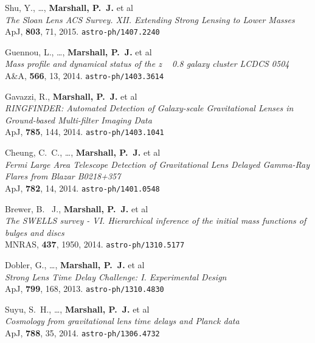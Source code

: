 \begin{revnumerate}
  \item{Shu, Y., \ldots, \textbf{Marshall, P.~J.} et al\\
  \textit{The Sloan Lens ACS Survey. XII. Extending Strong Lensing to Lower Masses}\\
  ApJ, \textbf{803}, 71, 2015.
  \texttt{astro-ph/1407.2240}
  }

  \item{Guennou, L., \ldots, \textbf{Marshall, P.~J.} et al\\
  \textit{Mass profile and dynamical status of the z ~ 0.8 galaxy cluster LCDCS 0504}\\
  A\&A, \textbf{566}, 13, 2014.
  \texttt{astro-ph/1403.3614}
  }

  \item{Gavazzi, R., \textbf{Marshall, P.~J.} et al\\
  \textit{RINGFINDER: Automated Detection of Galaxy-scale Gravitational Lenses in Ground-based Multi-filter Imaging Data}\\
  ApJ, \textbf{785}, 144, 2014.
  \texttt{astro-ph/1403.1041}
  }

  \item{{Cheung}, C.~C., \ldots, \textbf{Marshall, P.~J.} et al\\
  \textit{Fermi Large Area Telescope Detection of Gravitational Lens Delayed Gamma-Ray Flares from Blazar B0218+357}\\
  ApJ, \textbf{782}, 14, 2014.
  \texttt{astro-ph/1401.0548}
  }

  \item{{Brewer}, B.~ J., \textbf{Marshall, P.~J.} et al\\
  \textit{The SWELLS survey - VI. Hierarchical inference of the initial mass functions of bulges and discs}\\
  MNRAS, \textbf{437}, 1950, 2014.
  \texttt{astro-ph/1310.5177}
  }

  \item{{Dobler}, G., \ldots, \textbf{Marshall, P.~J.} et al\\
  \textit{Strong Lens Time Delay Challenge: I. Experimental Design}\\
  ApJ, \textbf{799}, 168, 2013.
  \texttt{astro-ph/1310.4830}
  }

  \item{{Suyu}, S.~H., \ldots, \textbf{{Marshall}, P.~J.} et al\\
  \textit{Cosmology from gravitational lens time delays and Planck data}\\
  ApJ, \textbf{788}, 35, 2014.
  \texttt{astro-ph/1306.4732}
  }


\end{revnumerate}
